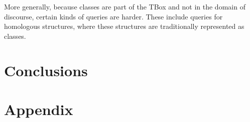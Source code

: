 \documentclass{my}
\begin{document}
More generally, because classes are part of the TBox and not in the domain of discourse, certain
kinds of queries are harder. These include queries for homologous structures, where these structures
are traditionally represented as classes.


\section{Conclusions}






\newpage
\section*{Appendix}
\end{document}

